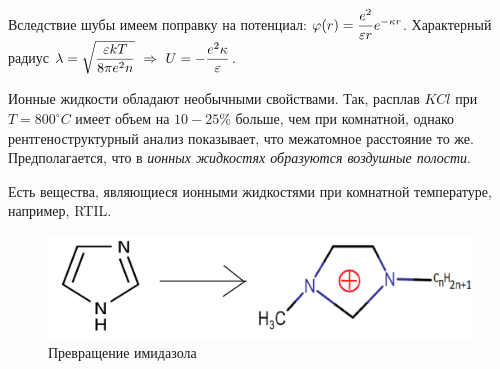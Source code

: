 
\begin{lecture}
	Вследствие шубы имеем поправку на потенциал: $ \varphi (r) = \dfrac{e^2}{\varepsilon r} e^{-\kappa r} $.
	Характерный радиус $ \lambda  = \sqrt{\dfrac{\varepsilon k T}{8 \pi e^2 n}}~\Rightarrow~ U = -\dfrac{e^2 \kappa}{\varepsilon}$.
	\begin{lecSection}
       Ионные жидкости обладают необычными свойствами. 
       Так, расплав $ KCl $  при $ T=800^\circ C $ имеет объем на $ 10-25\% $ больше, чем при комнатной, однако рентгеноструктурный анализ показывает, что межатомное расстояние то же. Предполагается, что в \textit{ионных жидкостях образуются воздушные полости}.
		
		Есть вещества, являющиеся ионными жидкостями при комнатной температуре, например, RTIL.
		\begin{figure}[h]
			\centering\includegraphics[width=0.8\linewidth]{lecture_11/imidazole}
			\caption{Превращение имидазола}
			\label{fig:11:imid_transform}
		\end{figure}
		

\end{lecSection}
\end{lecture}
